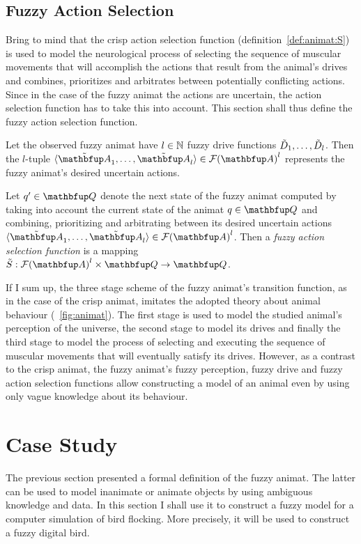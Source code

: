 \subsection{Fuzzy Action Selection}
Bring to mind that the crisp action selection function (definition~\ref{def:animat:S}) is used to model the neurological process of selecting the sequence of muscular movements that will accomplish the actions that result from the animal's drives and combines, prioritizes and arbitrates between potentially conflicting actions. Since in the case of the fuzzy animat the actions are uncertain, the action selection function has to take this into account. This section shall thus define the fuzzy action selection function.

Let the observed fuzzy animat have $l \in \mathbb{N}$ fuzzy drive functions ${\tilde{D}}_1,\ldots,{\tilde{D}}_l$. Then the $l$-tuple $\langle \fset{A}_1,\ldots,\fset{A}_l \rangle \in \fpowset{\set{A}}^l$ represents the fuzzy animat's desired uncertain actions.

\begin{definition}
\label{def:fuzzyAnimat:S}
Let $q' \in \set{Q}$ denote the next state of the fuzzy animat computed by taking into account the current state of the animat $q \in \set{Q}$ and combining, prioritizing and arbitrating between its desired uncertain actions $\langle \fset{A}_1,\ldots,\fset{A}_l \rangle \in \fpowset{\set{A}}^l$. Then a \emph{fuzzy action selection function} is a mapping $\ffunc{S}: \fpowset{\set{A}}^l \times \set{Q} \rightarrow \set{Q}$.
\end{definition}

If I sum up, the three stage scheme of the fuzzy animat's transition function, as in the case of the crisp animat, imitates the adopted theory about animal behaviour (\fig~\ref{fig:animat}). The first stage is used to model the studied animal's perception of the universe, the second stage to model its drives and finally the third stage to model the process of selecting and executing the sequence of muscular movements that will eventually satisfy its drives. However, as a contrast to the crisp animat, the fuzzy animat's fuzzy perception, fuzzy drive and fuzzy action selection functions allow constructing a model of an animal even by using only vague knowledge about its behaviour. 


\section{Case Study}
\label{sec:fuzzyAnimat:afd}
The previous section presented a formal definition of the fuzzy animat. The latter can be used to model inanimate or animate objects by using ambiguous knowledge and data. In this section I shall use it to construct a fuzzy model for a computer simulation of bird flocking. More precisely, it will be used to construct a fuzzy digital bird. 

